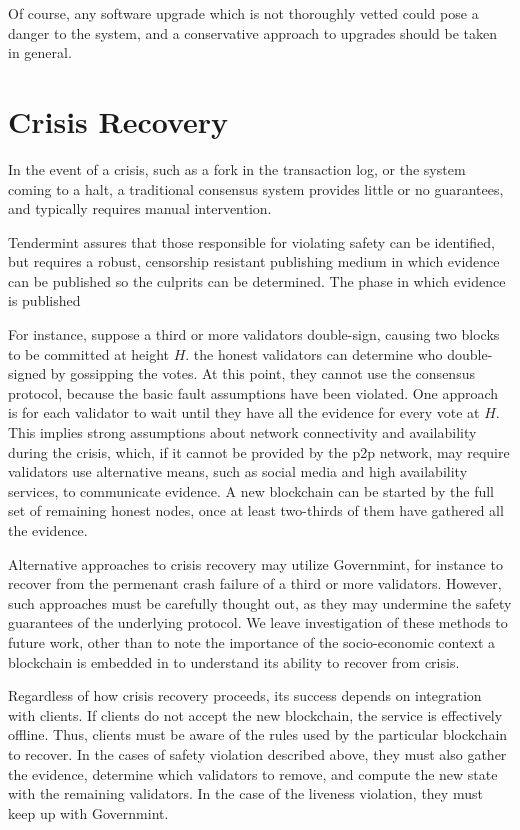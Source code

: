 Of course, any software upgrade which is not thoroughly vetted could pose a danger to the system,
and a conservative approach to upgrades should be taken in general.

\section{Crisis Recovery}

In the event of a crisis, such as a fork in the transaction log,
or the system coming to a halt, 
a traditional consensus system provides little or no guarantees,
and typically requires manual intervention.

Tendermint assures that those responsible for violating safety can be identified,
but requires a robust, censorship resistant publishing medium in which evidence can be published 
so the culprits can be determined. 
The phase in which evidence is published 

For instance, suppose a third or more validators double-sign, 
causing two blocks to be committed at height $H$.
the honest validators can determine who double-signed by gossipping the votes.
At this point, they cannot use the consensus protocol, because the basic fault assumptions have been violated.
One approach is for each validator to wait until they have all the evidence for every vote at $H$.
This implies strong assumptions about network connectivity and availability during the crisis,
which, if it cannot be provided by the p2p network, may require validators use alternative means, 
such as social media and high availability services, to communicate evidence.
A new blockchain can be started by the full set of remaining honest nodes, 
once at least two-thirds of them have gathered all the evidence.

Alternative approaches to crisis recovery may utilize Governmint, 
for instance to recover from the permenant crash failure of a third or more validators.
However, such approaches must be carefully thought out, 
as they may undermine the safety guarantees of the underlying protocol.
We leave investigation of these methods to future work, 
other than to note the importance of the socio-economic context a blockchain is embedded in to understand its ability to recover from crisis.

Regardless of how crisis recovery proceeds, its success depends on integration with clients.
If clients do not accept the new blockchain, the service is effectively offline.
Thus, clients must be aware of the rules used by the particular blockchain to recover.
In the cases of safety violation described above, they must also gather the evidence,
determine which validators to remove, and compute the new state with the remaining validators.
In the case of the liveness violation, they must keep up with Governmint.


